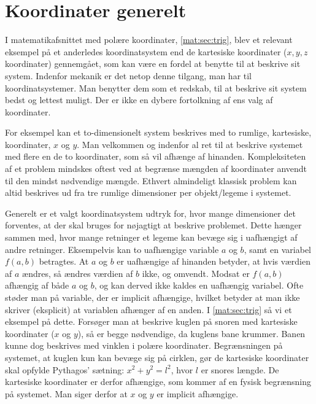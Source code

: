 \section{Koordinater generelt}
I matematikafsnittet med polære koordinater, \cref{mat:sec:trig}, blev et relevant eksempel på et anderledes koordinatsystem end de kartesiske koordinater ($x,y,z$ koordinater) gennemgået, som kan være en fordel at benytte til at beskrive sit system. Indenfor mekanik er det netop denne tilgang, man har til koordinatsystemer. Man benytter dem som et redskab, til at beskrive sit system bedst og lettest muligt. Der er ikke en dybere fortolkning af ens valg af koordinater.

For eksempel kan et to-dimensionelt system beskrives med to rumlige, kartesiske, koordinater, $x$ og $y$. Man velkommen og indenfor al ret til at beskrive systemet med flere en de to koordinater, som så vil afhænge af hinanden. Kompleksiteten af et problem mindskes oftest ved at begrænse mængden af koordinater anvendt til den mindst nødvendige mængde. Ethvert almindeligt klassisk problem kan altid beskrives ud fra tre rumlige dimensioner per objekt/legeme i systemet.

Generelt er et valgt koordinatsystem udtryk for, hvor mange dimensioner det forventes, at der skal bruges for nøjagtigt at beskrive problemet. Dette hænger sammen med, hvor mange retninger et legeme kan bevæge sig i uafhængigt af andre retninger. Eksempelvis kan to uafhængige variable $a$ og $b$, samt en variabel $f(a,b)$ betragtes. At $a$ og $b$ er uafhængige af hinanden betyder, at hvis værdien af $a$ ændres, så ændres værdien af $b$ ikke, og omvendt. Modsat er $f(a,b)$ afhængig af både $a$ og $b$, og kan derved ikke kaldes en uafhængig variabel. Ofte støder man på variable, der er implicit afhængige, hvilket betyder at man ikke skriver (eksplicit) at variablen afhænger af en anden. I \cref{mat:sec:trig} så vi et eksempel på dette. Forsøger man at beskrive kuglen på snoren med kartesiske koordinater ($x$ og $y$), så er begge nødvendige, da kuglens bane krummer. Banen kunne dog beskrives med vinklen i polære koordinater. Begrænsningen på systemet, at kuglen kun kan bevæge sig på cirklen, gør de kartesiske koordinater skal opfylde Pythagos' sætning: $x^2 + y^2 = l^2$, hvor $l$ er snores længde. De kartesiske koordinater er derfor afhængige, som kommer af en fysisk begrænsning på systemet. Man siger derfor at $x$ og $y$ er implicit afhængige.
%

